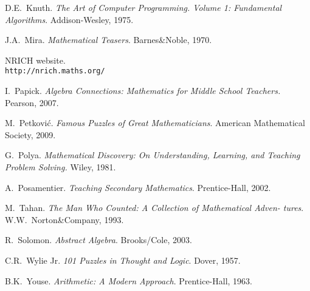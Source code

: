 \begin{thebibliography}{99}
 D.E.\ Knuth. \emph{The Art of Computer Programming. Volume 1: Fundamental Algorithms}. Addison-Wesley, 1975.

 J.A.\ Mira. \emph{Mathematical Teasers}. Barnes\&Noble, 1970.

 NRICH website.
\\ \texttt{http://nrich.maths.org/}

 I.\ Papick. \emph{Algebra Connections: Mathematics
  for Middle School Teachers.} Pearson, 2007.

 M.\ Petkovi\'{c}. \emph{Famous Puzzles of Great Mathematicians}. American Mathematical Society, 2009.

 G.\ Polya. \emph{Mathematical Discovery: On
  Understanding, Learning, and Teaching Problem Solving.} Wiley, 1981.

 A.\ Posamentier. \emph{Teaching Secondary Mathematics}. Prentice-Hall, 2002.

 M.\ Tahan. \emph{The Man Who Counted: A Collection of Mathematical Adven-
tures}. W.W.\ Norton\&Company, 1993.

 R.\ Solomon. \emph{Abstract Algebra}. Brooks/Cole, 2003.

 C.R.\ Wylie Jr. \emph{101 Puzzles in Thought and
  Logic}. Dover, 1957.

 B.K.\ Youse. \emph{Arithmetic: A Modern Approach}. Prentice-Hall, 1963.

\end{thebibliography}



\printindex
